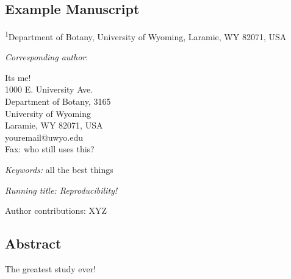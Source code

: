 

\clearpage
\chapter{}
\section{Example Manuscript}


\medskip


\bigskip   

\noindent \parbox[t]{6.5in}{\textsuperscript{1}Department of Botany, University of
  Wyoming, Laramie, WY 82071, USA}

\vspace{2in}

\noindent \emph{Corresponding author}: \parbox[t]{4in}{Its me!\\
  1000 E. University Ave.\\
  Department of Botany, 3165\\
  University of Wyoming\\
  Laramie, WY 82071, USA\\
  youremail@uwyo.edu\\
  Fax: who still uses this?
}

\bigskip

\noindent 
\emph{Keywords:} all the best things

\bigskip
\noindent \emph{Running title: Reproducibility!}

\bigskip

\noindent Author contributions: XYZ
\newpage


\section*{Abstract}
The greatest study ever!


